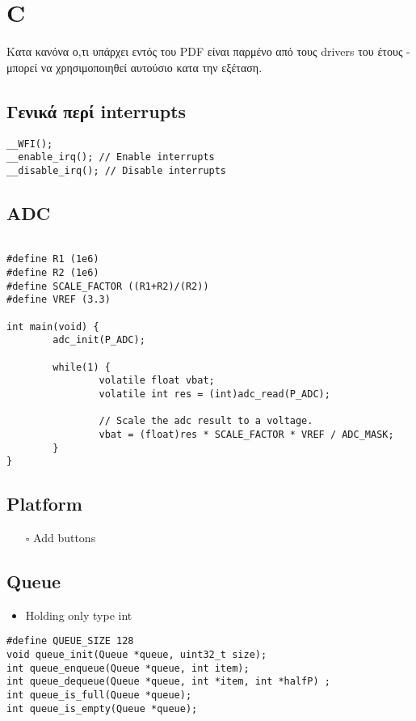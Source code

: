\documentclass[11pt]{article}
\begin{document}
\section{C}
\label{sec:org61b04fd}
\begin{note}
Κατα κανόνα ο,τι υπάρχει εντός του PDF είναι παρμένο από τους drivers
του έτους - μπορεί να χρησιμοποιηθεί αυτούσιο κατα την εξέταση.
\label{org990bacb}
\end{note}
\subsection{Γενικά περί interrupts}
\label{sec:org283eac0}
\begin{verbatim}
__WFI();
__enable_irq(); // Enable interrupts
__disable_irq(); // Disable interrupts
\end{verbatim}
\subsection{ADC}
\label{sec:orgfcb56f7}
\begin{verbatim}

#define R1 (1e6)
#define R2 (1e6)
#define SCALE_FACTOR ((R1+R2)/(R2))
#define VREF (3.3)

int main(void) {
        adc_init(P_ADC);

        while(1) {
                volatile float vbat;
                volatile int res = (int)adc_read(P_ADC);

                // Scale the adc result to a voltage.
                vbat = (float)res * SCALE_FACTOR * VREF / ADC_MASK;
        }
}
\end{verbatim}
\subsection{Platform}
\label{sec:org93331d6}
\begin{itemize}
\item[{$\square$}] Add buttons
\end{itemize}
\subsection{Queue}
\label{sec:org3f2e331}
\begin{itemize}
\item Holding only type int
\end{itemize}

\begin{verbatim}
#define QUEUE_SIZE 128
void queue_init(Queue *queue, uint32_t size);
int queue_enqueue(Queue *queue, int item);
int queue_dequeue(Queue *queue, int *item, int *halfP) ;
int queue_is_full(Queue *queue);
int queue_is_empty(Queue *queue);
\end{verbatim}
\end{document}
